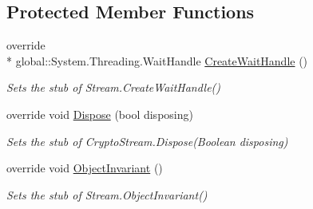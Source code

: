 \subsection*{Protected Member Functions}
\begin{DoxyCompactItemize}
\item 
override \\*
global\-::\-System.\-Threading.\-Wait\-Handle \hyperlink{class_system_1_1_security_1_1_cryptography_1_1_fakes_1_1_stub_crypto_stream_a54841d2808eea0a67f97d4c910a78650}{Create\-Wait\-Handle} ()
\begin{DoxyCompactList}\small\item\em Sets the stub of Stream.\-Create\-Wait\-Handle()\end{DoxyCompactList}\item 
override void \hyperlink{class_system_1_1_security_1_1_cryptography_1_1_fakes_1_1_stub_crypto_stream_a98bd00ca312cb951856759a688264527}{Dispose} (bool disposing)
\begin{DoxyCompactList}\small\item\em Sets the stub of Crypto\-Stream.\-Dispose(\-Boolean disposing)\end{DoxyCompactList}\item 
override void \hyperlink{class_system_1_1_security_1_1_cryptography_1_1_fakes_1_1_stub_crypto_stream_abf4f2ddc393fd094b4fab5c61db94854}{Object\-Invariant} ()
\begin{DoxyCompactList}\small\item\em Sets the stub of Stream.\-Object\-Invariant()\end{DoxyCompactList}\end{DoxyCompactItemize}
